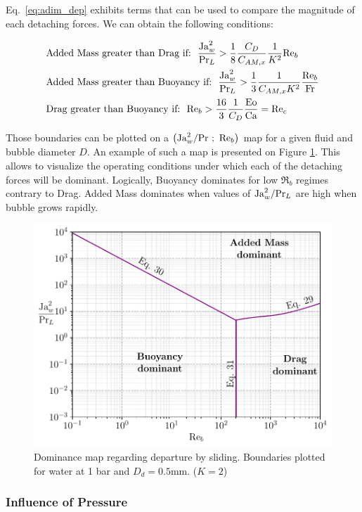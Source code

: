 Eq.~\ref{eq:adim_dep} exhibits terms that can be used to compare the magnitude of each detaching forces. We can obtain the following conditions:

\begin{align}
&\text{Added Mass greater than Drag if:}\ \ \frac{\Ja_{w}^{2}}{\Pr_{L}}>\frac{1}{8}\frac{C_{D}}{C_{AM,x}}\frac{1}{K^{2}}\Re_{b} \label{eq:AMvsD}\\
&\text{Added Mass greater than Buoyancy if:}\ \  \frac{\Ja_{w}^{2}}{\Pr_{L}}>\frac{1}{3}\frac{1}{C_{AM,x}K^{2}}\frac{\Re_{b}}{\Fr} \label{eq:AMvsB}\\
&\text{Drag greater than Buoyancy if:}\ \  \Re_{b}>\frac{16}{3}\frac{1}{C_{D}}\frac{\Eo}{\Ca}=\Re_{c} \label{eq:DvsB}
\end{align}


Those boundaries can be plotted on a $\left( \mathrm{Ja}_{w}^{2}/\mathrm{Pr}\ ;\ \mathrm{Re}_{b} \right)$ map for a given fluid and bubble diameter $D$. An example of such a map is presented on Figure \ref{fig:ND_map1}. This allows to visualize the operating conditions under which each of the detaching forces will be dominant. Logically, Buoyancy dominates for low $\Re_{b}$ regimes contrary to Drag. Added Mass dominates when values of $\mathrm{Ja}_{w}^{2}/\mathrm{Pr}_{L}$ are high \ie when bubble grows rapidly.





\begin{figure}[h!]
\centering
\includegraphics[width=0.7\linewidth]{img/forces/ND_map1.pdf}
\caption{Dominance map regarding departure by sliding. Boundaries plotted for water at 1 bar and $D_{d}=0.5$mm. ($K=2$)}
\label{fig:ND_map1}
\end{figure}



\subsubsection{Influence of Pressure}

